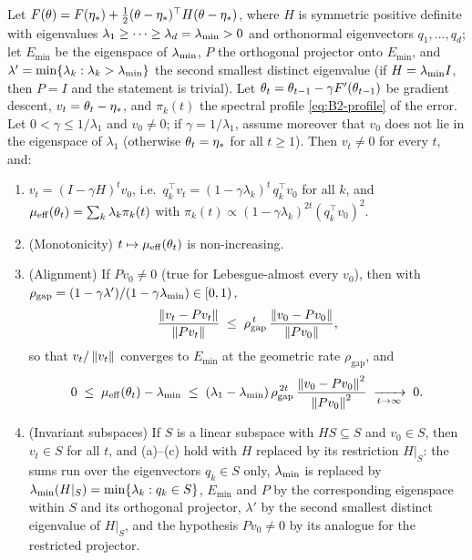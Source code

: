 \begin{proposition}\label{prop:B2-gd}
Let $F(\theta)=F(\eta_\ast)+\frac12(\theta-\eta_\ast)^\top H(\theta-\eta_\ast)$, where $H$ is symmetric positive
definite with eigenvalues $\lambda_1\ge\dots\ge\lambda_d=\lambda_{\min}>0$ and orthonormal eigenvectors $q_1,\dots,q_d$; let
$E_{\min}$ be the eigenspace of $\lambda_{\min}$, $P$ the orthogonal projector onto $E_{\min}$, and
$\lambda'=\min\{\lambda_k:\lambda_k>\lambda_{\min}\}$ the second smallest distinct eigenvalue (if $H=\lambda_{\min} I$, then $P=I$ and
the statement is trivial). Let $\theta_t=\theta_{t-1}-\gamma F'(\theta_{t-1})$ be gradient descent,
$v_t=\theta_t-\eta_\ast$, and $\pi_k(t)$ the spectral profile \eqref{eq:B2-profile} of the error.
Let $0<\gamma\le1/\lambda_1$ and $v_0\neq0$; if $\gamma=1/\lambda_1$, assume moreover that $v_0$ does not lie in the
eigenspace of $\lambda_1$ (otherwise $\theta_t=\eta_\ast$ for all $t\ge1$). Then $v_t\neq0$ for every $t$, and:
\begin{enumerate}[label=(\alph*)]
\item $v_t=(I-\gamma H)^tv_0$, i.e.\ $q_k^\top v_t=(1-\gamma\lambda_k)^t\,q_k^\top v_0$ for all $k$, and
$\mu_{\mathrm{eff}}(\theta_t)=\sum_k\lambda_k\pi_k(t)$ with $\pi_k(t)\propto(1-\gamma\lambda_k)^{2t}(q_k^\top v_0)^2$.
\item (Monotonicity) $t\mapsto\mu_{\mathrm{eff}}(\theta_t)$ is non-increasing.
\item (Alignment) If $Pv_0\neq0$ (true for Lebesgue-almost every $v_0$), then with
$\rho_{\mathrm{gap}}=(1-\gamma\lambda')/(1-\gamma\lambda_{\min})\in[0,1)$,
\[
\frac{\left\|v_t-Pv_t\right\|}{\left\|Pv_t\right\|}\;\le\;\rho_{\mathrm{gap}}^{\,t}\,\frac{\left\|v_0-Pv_0\right\|}{\left\|Pv_0\right\|},
\]
so that $v_t/\left\|v_t\right\|$ converges to $E_{\min}$ at the geometric rate $\rho_{\mathrm{gap}}$, and
\begin{equation}\label{ineq:gd-align}
0\;\le\;\mu_{\mathrm{eff}}(\theta_t)-\lambda_{\min}\;\le\;(\lambda_1-\lambda_{\min})\,\rho_{\mathrm{gap}}^{\,2t}\,\frac{\left\|v_0-Pv_0\right\|^2}{\left\|Pv_0\right\|^2}
\;\xrightarrow[t\to\infty]{}\;0 .
\end{equation}
\item (Invariant subspaces) If $S$ is a linear subspace with $HS\subseteq S$ and $v_0\in S$, then $v_t\in S$ for all $t$,
and (a)--(c) hold with $H$ replaced by its restriction $H|_S$: the sums run over the eigenvectors $q_k\in S$ only,
$\lambda_{\min}$ is replaced by $\lambda_{\min}(H|_S)=\min\{\lambda_k:q_k\in S\}$, $E_{\min}$ and $P$ by the corresponding eigenspace
within $S$ and its orthogonal projector, $\lambda'$ by the second smallest distinct eigenvalue of $H|_S$, and the
hypothesis $Pv_0\neq0$ by its analogue for the restricted projector.
\end{enumerate}
\end{proposition}

